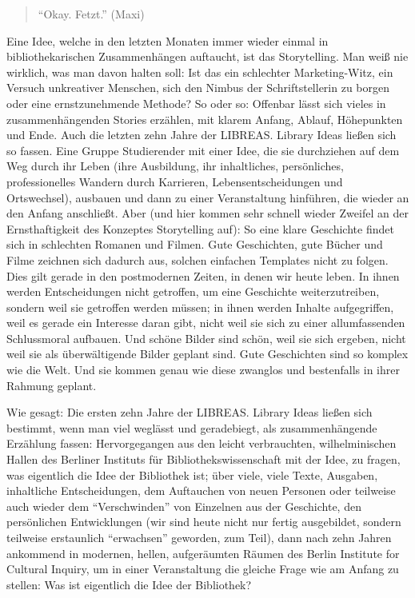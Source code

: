 \begin{quote}
\enquote{Okay. Fetzt.} (Maxi)
\end{quote}

\noindent Eine Idee, welche in den letzten Monaten immer wieder einmal in
bibliothekarischen Zusammenhängen auftaucht, ist das Storytelling. Man
weiß nie wirklich, was man davon halten soll: Ist das ein schlechter
Marketing-Witz, ein Versuch unkreativer Menschen, sich den Nimbus der
Schriftstellerin zu borgen oder eine ernstzunehmende Methode? So oder
so: Offenbar lässt sich vieles in zusammenhängenden Stories erzählen,
mit klarem Anfang, Ablauf, Höhepunkten und Ende. Auch die letzten zehn
Jahre der LIBREAS. Library Ideas ließen sich so fassen. Eine Gruppe
Studierender mit einer Idee, die sie durchziehen auf dem Weg durch ihr
Leben (ihre Ausbildung, ihr inhaltliches, persönliches, professionelles
Wandern durch Karrieren, Lebensentscheidungen und Ortswechsel), ausbauen
und dann zu einer Veranstaltung hinführen, die wieder an den Anfang
anschließt. Aber (und hier kommen sehr schnell wieder Zweifel an der
Ernsthaftigkeit des Konzeptes Storytelling auf): So eine klare
Geschichte findet sich in schlechten Romanen und Filmen. Gute
Geschichten, gute Bücher und Filme zeichnen sich dadurch aus, solchen
einfachen Templates nicht zu folgen. Dies gilt gerade in den
postmodernen Zeiten, in denen wir heute leben. In ihnen werden
Entscheidungen nicht getroffen, um eine Geschichte weiterzutreiben,
sondern weil sie getroffen werden müssen; in ihnen werden Inhalte
aufgegriffen, weil es gerade ein Interesse daran gibt, nicht weil sie
sich zu einer allumfassenden Schlussmoral aufbauen. Und schöne Bilder
sind schön, weil sie sich ergeben, nicht weil sie als überwältigende
Bilder geplant sind. Gute Geschichten sind so komplex wie die Welt. Und
sie kommen genau wie diese zwanglos und bestenfalls in ihrer Rahmung
geplant.

Wie gesagt: Die ersten zehn Jahre der LIBREAS. Library Ideas ließen
sich bestimmt, wenn man viel weglässt und geradebiegt, als
zusammenhängende Erzählung fassen: Hervorgegangen aus den leicht
verbrauchten, wilhelminischen Hallen des Berliner Instituts für
Bibliothekswissenschaft mit der Idee, zu fragen, was eigentlich die Idee
der Bibliothek ist; über viele, viele Texte, Ausgaben, inhaltliche
Entscheidungen, dem Auftauchen von neuen Personen oder teilweise auch
wieder dem \enquote{Verschwinden} von Einzelnen aus der Geschichte, den
persönlichen Entwicklungen (wir sind heute nicht nur fertig ausgebildet,
sondern teilweise erstaunlich \enquote{erwachsen} geworden, zum Teil),
dann nach zehn Jahren ankommend in modernen, hellen, aufgeräumten Räumen
des Berlin Institute for Cultural Inquiry, um in einer Veranstaltung die
gleiche Frage wie am Anfang zu stellen: Was ist eigentlich die Idee der
Bibliothek?

